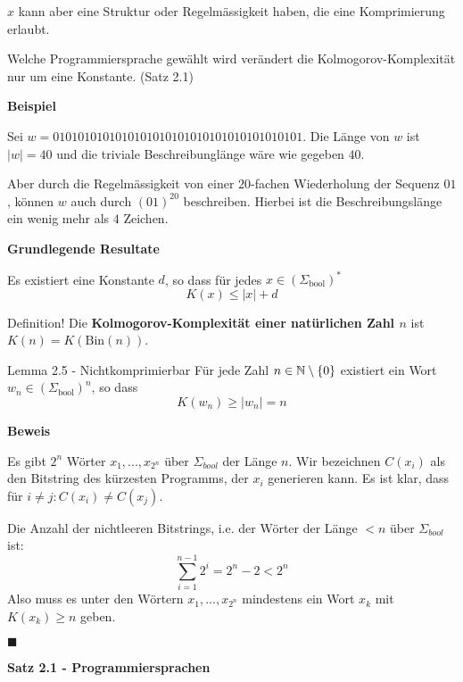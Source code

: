     $x$ kann aber eine Struktur oder Regelmässigkeit haben, die eine Komprimierung erlaubt.

    Welche Programmiersprache gewählt wird verändert die Kolmogorov-Komplexität nur um eine Konstante. (Satz 2.1)



    \textbf{Beispiel}
    
    Sei $w = 0101010101010101010101010101010101010101$. Die Länge von $w$ ist $|w| = 40$ und die triviale Beschreibunglänge wäre wie gegeben $40$.

    Aber durch die Regelmässigkeit von einer $20$-fachen Wiederholung der Sequenz $01$, können $w$ auch durch $(01)^{20}$ beschreiben. 
    Hierbei ist die Beschreibungslänge ein wenig mehr als $4$ Zeichen.



    \textbf{Grundlegende Resultate}
    \begin{mainbox}{}
        Es existiert eine Konstante $d$, so dass für jedes $x \in (\Sigma_{\text{bool}})^*$
        $$K(x) \leq |x| + d$$
    \end{mainbox}

    \begin{mainbox}{Definition!}
        Die \textbf{Kolmogorov-Komplexität einer natürlichen Zahl $n$} ist $K(n) = K(\text{Bin}(n))$.
    \end{mainbox}

    
    \begin{mainbox}{Lemma 2.5 - Nichtkomprimierbar}
        Für jede Zahl $n \in \mathbb{N} \setminus\{0\}$ existiert ein Wort $w_n \in (\Sigma_{\text{bool}})^n$, so dass 
        $$K(w_n) \geq |w_n| = n$$
    \end{mainbox}
    \textbf{Beweis}

    Es gibt $2^n$ Wörter $x_1, ..., x_{2^n}$ über $\Sigma_{bool}$ der Länge $n$. 
    Wir bezeichnen $C(x_i)$ als den Bitstring des kürzesten Programms, der $x_i$ generieren kann. Es ist klar, dass für $i \neq j: C(x_i) \neq C(x_j)$.

    Die Anzahl der nichtleeren Bitstrings, i.e. der Wörter der Länge $< n$ über $\Sigma_{bool}$ ist:
    $$\sum_{i = 1}^{n-1} 2^i = 2^n - 2 < 2^n$$
    Also muss es unter den Wörtern $x_1, ...,x_{2^n}$ mindestens ein Wort $x_k$ mit $K(x_k) \geq n$ geben.
    
    \hspace*{0pt}\hfill$\blacksquare$



    \textbf{Satz 2.1 - Programmiersprachen}

